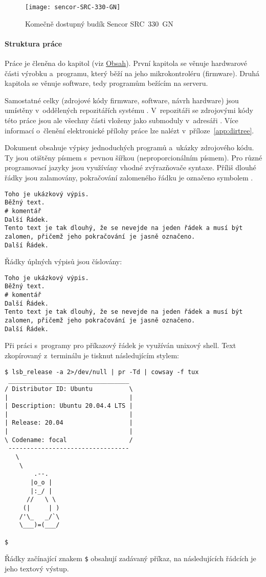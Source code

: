 \begin{figure}[htbp]
    \centering
    \texttt{[image: sencor-SRC-330-GN]}
    \caption{Komečně dostupný budík Sencor SRC~330~GN}
    \label{fig:sencor}
\end{figure}


\paragraph{Struktura práce}
Práce je členěna do kapitol (viz \hyperref[toc]{Obsah}). První kapitola se
věnuje hardwarové části výrobku a~programu, který běží na jeho mikrokontroléru
(firmware). Druhá kapitola se věnuje software, tedy programům bežícím na
serveru.

Samostatné celky (zdrojové kódy firmware, software, návrh hardware) jsou
umístěny v~oddělených repozitářích systému . V~repozitáři se
zdrojovými kódy této práce jsou ale všechny části vloženy jako submoduly
v~adresáři . Více informací o~členění elektronické přílohy
práce lze nalézt v~příloze~\vref{app:dirtree}.

Dokument obsahuje výpisy jednoduchých programů a~ukázky zdrojového kódu.
Ty jsou otištěny písmem s~pevnou šířkou (neproporcionálním písmem). Pro různé
programovací jazyky jsou využívány vhodné zvýrazňovače syntaxe. Příliš dlouhé
řádky jsou zalamovány, pokračování zalomeného řádku je označeno symbolem
\lstpostbreak{}.

\begin{lstlisting}[language=hashcomment]
Toho je ukázkový výpis.
Běžný text.
# komentář
Další Řádek.
Tento text je tak dlouhý, že se nevejde na jeden řádek a musí být zalomen, přičemž jeho pokračování je jasně označeno.
Další Řádek.
\end{lstlisting}

Řádky úplných výpisů jsou číslovány:
\begin{lstlisting}[language=hashcomment,style=numbers]
Toho je ukázkový výpis.
Běžný text.
# komentář
Další Řádek.
Tento text je tak dlouhý, že se nevejde na jeden řádek a musí být zalomen, přičemž jeho pokračování je jasně označeno.
Další Řádek.
\end{lstlisting}

Při práci s~programy pro příkazový řádek je využíván unixový shell.
Text zkopírovaný z~terminálu je tisknut následujícím stylem:
\begin{lstlisting}[style=terminal]
$ lsb_release -a 2>/dev/null | pr -Td | cowsay -f tux
 _________________________________
/ Distributor ID: Ubuntu          \
|                                 |
| Description: Ubuntu 20.04.4 LTS |
|                                 |
| Release: 20.04                  |
|                                 |
\ Codename: focal                 /
 ---------------------------------
   \
    \
        .--.
       |o_o |
       |:_/ |
      //   \ \
     (|     | )
    /'\_   _/`\
    \___)=(___/

$
\end{lstlisting}
Řádky začínající znakem \texttt{\$} obsahují zadávaný příkaz, na následujících
řádcích je jeho textový výstup.
